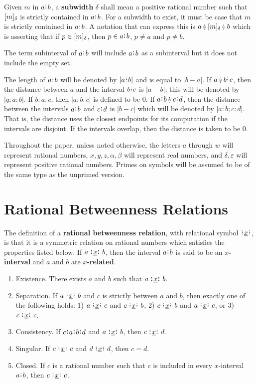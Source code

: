 \documentclass[12pt]{article}
\begin{document}
Given $m$ in $a \rint  b$, a \textbf{subwidth} $\delta$ shall mean a positive rational number such that $[m]_{\delta}$ is strictly contained in $a\rint b$. For a subwidth to exist, it must be case that $m$ is strictly contained in $a\rint b$. A notation that can express this is $a \betneq \halo{m} \betneq b$ which is asserting that if $p \in [m]_{\delta}$, then $p \in a\rint b$, $p \neq a$ and $p \neq b$. 

The term subinterval of $a\rint b$ will include $a\rint b$ as a subinterval but it does not include the empty set. 

The length of $a\rint b$ will be denoted by $|a\rint b|$ and is equal to $|b-a|$. If $a \betneq b \rint c$, then the distance between $a$ and the interval $b \rint c$ is $|a-b|$; this will be denoted by $|q; a:b|$. If $b:a:c$, then $|a; b:c|$ is defined to be $0$. If $a \rint b \betneq c \rint d$, then the distance between the intervals $a \rint b$  and $c \rint d$ is $|b-c|$ which will be denoted by $|a:b; c:d|$.  That is, the distance uses the closest endpoints for its computation if the intervals are disjoint. If the intervals overlap, then the distance is taken to be $0$. 

Throughout the paper, unless noted otherwise, the letters $a$ through $w$ will represent rational numbers, $x, y, z, \alpha, \beta$ will represent real numbers, and $\delta, \varepsilon$ will represent positive rational numbers. Primes on symbols will be assumed to be of the same type as the unprimed version. 

\section{Rational Betweenness Relations}

The definition of a \textbf{rational betweenness relation}, with relational symbol $\xrel$, is that it is a symmetric relation on rational numbers which satisfies the properties listed below. If $a \xrel b$, then the interval $a\rint b$ is said to be an \textbf{$x$-interval} and $a$ and $b$ are \textbf{$x$-related}.
\begin{enumerate}
    \item Existence. There exists $a$ and $b$ such that $a\xrel b$.
    \item Separation. If $a \xrel b$ and $c$ is strictly between $a$ and $b$, then exactly one of the following holds:  1) $a \xrel c$ and \sout{$c \xrel b$}, 2) $c \xrel b$ and \sout{$a \xrel c$}, or 3) $c \xrel c$. 
    \item Consistency. If $c \rint  a \rint  b \rint  d$ and $a \xrel b$, then $c \xrel d$. 
    \item Singular. If $c \xrel c$ and $d \xrel d$, then $c=d$. 
    \item Closed. If $c$ is a rational number such that $c$ is included in every $x$-interval $a\rint b$, then  $c \xrel c$. 
\end{enumerate}
\end{document}

